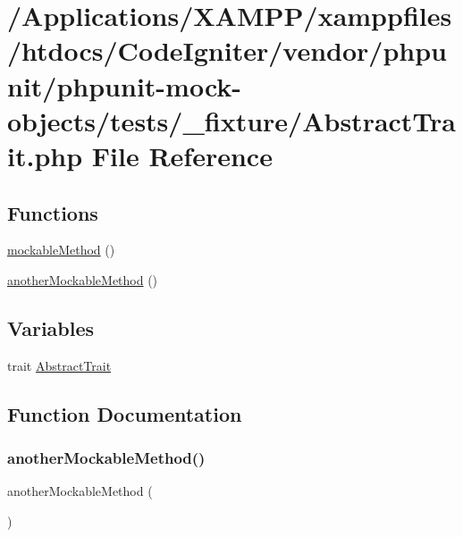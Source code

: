 \hypertarget{_abstract_trait_8php}{}\section{/\+Applications/\+X\+A\+M\+P\+P/xamppfiles/htdocs/\+Code\+Igniter/vendor/phpunit/phpunit-\/mock-\/objects/tests/\+\_\+fixture/\+Abstract\+Trait.php File Reference}
\label{_abstract_trait_8php}
\subsection*{Functions}
\begin{DoxyCompactItemize}
\item 
\mbox{\hyperlink{_abstract_trait_8php_a81ef193e0246f47187adf302f8bff813}{mockable\+Method}} ()
\item 
\mbox{\hyperlink{_abstract_trait_8php_a16beb11dd7ede7590ad0bea724355ec6}{another\+Mockable\+Method}} ()
\end{DoxyCompactItemize}
\subsection*{Variables}
\begin{DoxyCompactItemize}
\item 
trait \mbox{\hyperlink{_abstract_trait_8php_a318b09bd2aa175f2de5f7dd5fb869624}{Abstract\+Trait}}
\end{DoxyCompactItemize}


\subsection{Function Documentation}
\mbox{\label{_abstract_trait_8php_a16beb11dd7ede7590ad0bea724355ec6}} 
\subsubsection{\texorpdfstring{another\+Mockable\+Method()}{anotherMockableMethod()}}
{\footnotesize\ttfamily another\+Mockable\+Method (\begin{DoxyParamCaption}{ }\end{DoxyParamCaption})}

